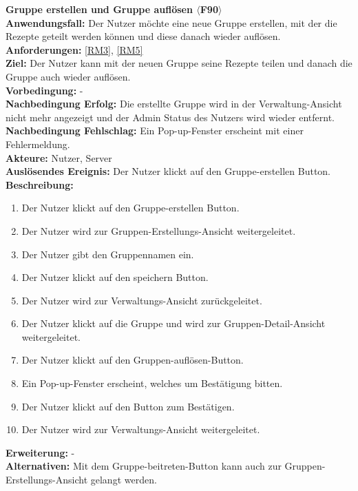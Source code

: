 \documentclass[parskip=full]{scrartcl}
\begin{document}
\textbf{Gruppe erstellen und Gruppe auflösen $\langle$F90$\rangle$}\\
\textbf{Anwendungsfall:} Der Nutzer möchte eine neue Gruppe erstellen, mit der die Rezepte geteilt werden können und diese danach wieder auflösen.\\
\textbf{Anforderungen:} \ref{RM3}, \ref{RM5} \\
\textbf{Ziel:} Der Nutzer kann mit der neuen Gruppe seine Rezepte teilen und danach die Gruppe auch wieder auflösen.\\
\textbf{Vorbedingung:} -\\
\textbf{Nachbedingung Erfolg:} Die erstellte Gruppe wird in der Verwaltung-Ansicht nicht mehr angezeigt und der Admin Status des Nutzers wird wieder entfernt.\\
\textbf{Nachbedingung Fehlschlag:} Ein Pop-up-Fenster erscheint mit einer Fehlermeldung.\\
\textbf{Akteure:} Nutzer, Server\\
\textbf{Auslösendes Ereignis:} Der Nutzer klickt auf den Gruppe-erstellen Button.\\
\textbf{Beschreibung:}
\begin{enumerate}	
    \item Der Nutzer klickt auf den Gruppe-erstellen Button.
    \item Der Nutzer wird zur Gruppen-Erstellungs-Ansicht weitergeleitet.
    \item Der Nutzer gibt den Gruppennamen ein.
    \item Der Nutzer klickt auf den speichern Button.
    \item Der Nutzer wird zur Verwaltungs-Ansicht zurückgeleitet.
    \item Der Nutzer klickt auf die Gruppe und wird zur Gruppen-Detail-Ansicht weitergeleitet.
    \item Der Nutzer klickt auf den Gruppen-auflösen-Button.
    \item Ein Pop-up-Fenster erscheint, welches um Bestätigung bitten.
    \item Der Nutzer klickt auf den Button zum Bestätigen.
    \item Der Nutzer wird zur Verwaltungs-Ansicht weitergeleitet.
\end{enumerate}
\textbf{Erweiterung:} -\\
\textbf{Alternativen:} Mit dem Gruppe-beitreten-Button kann auch zur Gruppen-Erstellungs-Ansicht gelangt werden.\\
\newpage
\end{document}
